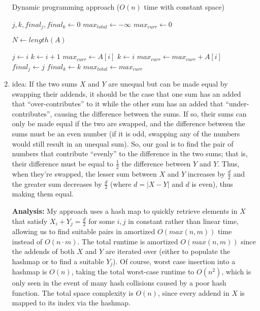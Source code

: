 \documentclass[12pt]{article}
\begin{document}
\begin{enumerate}
    \begin{algorithm}
        \caption{Dynamic programming approach ($O(n)$ time with constant space)}
        \begin{algorithmic}
            \State $j, k, final_j, final_k \gets 0$
            \State $max_{total} \gets -\infty$
            \State $max_{curr} \gets 0$
            
            \State $N \gets length(A)$
            
                    \State $j \gets i$
                    \State $k \gets i + 1$
                    \State $max_{curr} \gets A[i]$
                \Else
                    \State $k \gets i$
                    \State $max_{curr} \gets max_{curr} + A[i]$
                    \State $final_j \gets j$
                    \State $final_k \gets k$
                    \State $max_{total} \gets max_{curr}$
                    \EndIf
                \EndIf
            \EndFor
        \end{algorithmic}
    \end{algorithm}
    
    \item idea: If the two sums $X$ and $Y$ are unequal but can be made equal by swapping their addends, it should be the 
    case that one sum has an added that ``over-contributes'' to it while the other sum has an added that ``under-contributes'', causing the 
    difference between the sums. If so, their sums can only be made equal if the two are swapped, and the difference between the sums must 
    be an even number (if it is odd, swapping any of the numbers would still result in an unequal sum). So, our goal is to 
    find the pair of numbers that contribute ``evenly'' to the difference in the two sums; that is, their difference must be 
    equal to $\frac{1}{2}$ the difference between $Y$ and $Y$. Thus, when they're swapped, the lesser sum between $X$ and $Y$ 
    increases by $\frac{d}{2}$ and the greater sum decreases by $\frac{d}{2}$ (where $d = |X - Y|$ and $d$ is even), thus making them equal.

    \textbf{Analysis:} My approach uses a hash map to quickly retrieve elements in $X$ that satisfy $X_i + Y_j = \frac{d}{2}$ for some $i, j$ in 
    constant rather than linear time, allowing us to find suitable pairs in amortized $O(max(n, m))$ time instead of $O(n \cdot m)$.
    The total runtime is amortized $O(max(n, m))$ since the addends of both $X$ and $Y$ are iterated over (either to populate the hashmap or to find a suitable $Y_j$). Of course, worst 
    case insertion into a hashmap is $O(n)$, taking the total worst-case runtime to $O(n^2)$, which is only seen in the event of 
    many hash collisions caused by a poor hash function. The total space complexity is $O(n)$, since every addend in $X$ is mapped to its index via the hashmap.


\end{enumerate}
\end{document}
